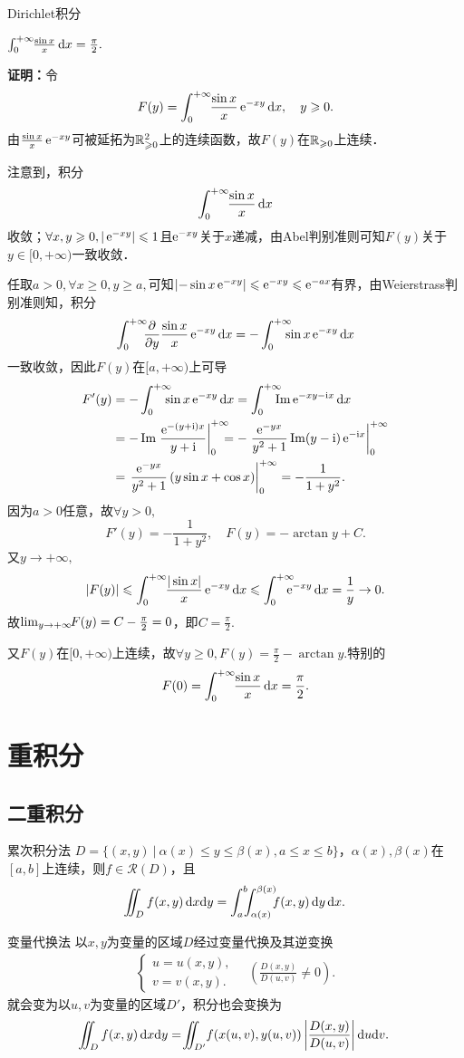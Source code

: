 \begin{example}{Dirichlet积分}{}
	\begin{center}
		$\int\zti\bs3\frac{\sin x}x\d x=\frac{\pi}2.$
	\end{center}
	\textbf{证明：}令
	\[F(y)=\int\zti\bs3\frac{\sin x}x\e{-xy}\d x,\quad y\geqslant 0.\]
	由$\frac{\sin x}x\e{-xy}$可被延拓为$\RR_{\geqslant 0}^2$上的连续函数，故$F(y)$在$\RR_{\geqslant 0}$上连续．

	注意到，积分
	\[\int\zti\bs3\frac{\sin x}x\d x\]
	收敛；$\forall x,y\geqslant 0,|\e{-xy}|\leqslant 1$且$\e{-xy}$关于$x$递减，由Abel判别准则可知$F(y)$关于$y\in[0,+\infty)$一致收敛．

	任取$a>0,\forall x\geqslant 0,y\geqslant a,$可知$\left|-\sin x\e{-xy}\right|\leqslant \e{-xy}\leqslant \e{-ax}$有界，由Weierstrass判别准则知，积分
	\[\int\zti\bs5\pv {}y\frac{\sin x}x\e{-xy}\d x=-\int\zti\bs7\sin x\e{-xy}\d x\]
	一致收敛，因此$F(y)$在$[a,+\infty)$上可导
	\begin{align*}
		F'(y) & =-\int\zti\bs7\sin x\e{-xy}\d x=\int\zti\bs7\Im\e{-xy-\i x}\d x                                                \\
			  & =-\Im\left.\frac{\e{-(y+\i)x}}{y+\i}\right|\zti\bs7=-\left.\frac{\e{-yx}}{y^2+1}\Im(y-\i)\e{-\i x}\right|\zti \\
			  & =\left.\frac{\e{-yx}}{y^2+1}\left(y\sin x+\cos x\right)\right|\zti=-\frac1{1+y^2}.
	\end{align*}
	因为$a>0$任意，故$\forall y>0,$
	\[F'(y)=-\frac1{1+y^2},\quad F(y)=-\arctan y+C.\]
	又$y\to+\infty,$
	\[|F(y)|\leqslant\int\zti\bs3\frac{|\sin x|}x\e{-xy}\d x\leqslant\int\zti\bs8\e{-xy}\d x=\frac1y\to0.\]
	故$\lim_{y\to+\infty}\bs3F(y)=C-\frac{\pi}2=0$，即$C=\frac{\pi}2.$

	又$F(y)$在$[0,+\infty)$上连续，故$\forall y\geqslant 0,F(y)=\frac{\pi}2-\arctan y.$特别的
	\[F(0)=\int\zti\bs3\frac{\sin x}x\d x=\frac{\pi}2.\]
\end{example}
\newpage
\section{重积分}
\subsection{二重积分}
\begin{theorem}{累次积分法}{}
	$D=\{(x,y)~|~\alpha(x)\leqslant y\leqslant\beta(x),a\leqslant x\leqslant b\}$，$\alpha(x),\beta(x)$在$[a,b]$上连续，则$f\in\mathscr R(D)$，且
	\[\intt_Df(x,y)\d x\nd y=\int_a^b\bs5\int_{\alpha(x)}^{\beta(x)}\bs5f(x,y)\d y\d x.\]
\end{theorem}
\begin{theorem}{变量代换法}{}
	以$x,y$为变量的区域$D$经过变量代换及其逆变换
	\begin{align*}
		\begin{cases}
			u=u(x,y), \\
			v=v(x,y).
		\end{cases}
		\quad\left(\frac{D(x,y)}{D(u,v)}\neq 0\right).
	\end{align*}
	就会变为以$u,v$为变量的区域$D'$，积分也会变换为
	\[\intt_Df(x,y)\d x\nd y=\intt_{D'}\bs2f(x(u,v),y(u,v))\left|\frac{D(x,y)}{D(u,v)}\right|\d u\nd v.\]
\end{theorem}

